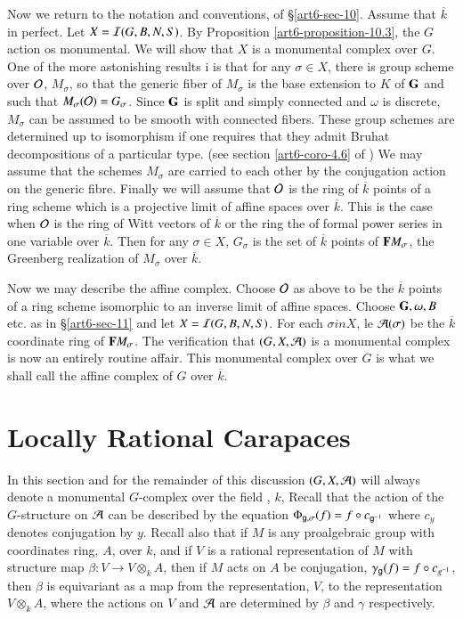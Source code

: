 Now we return to the notation and conventions, of \S \ref{art6-sec-10}. Assume that $\overline{k}$ in perfect. Let $X = \mathcal{I}(G, B, N, S)$. By Proposition \ref{art6-proposition-10.3}, the $G$ action os monumental. We will show that $X$ is a monumental complex over $G$. One of the more astonishing results i \cite{art6-keyBT II} is that for any $\sigma \in X$, there is group scheme over $\mathcal{O}$, $M_{\sigma}$, so that the generic fiber of $M_{\sigma}$ is the base extension to $K$ of $\mathbf{G}$ and such that $M_{\sigma}(\mathcal{O}) = G_{\sigma}$. Since $\mathbf{G}$ is split and simply connected and $\omega$ is discrete, $M_{\sigma}$ can be assumed to be smooth with connected fibers. These group schemes are determined up to isomorphism if one requires that they admit Bruhat decompositions of a particular type. (see section \ref{art6-coro-4.6} of \cite{art6-keyBT II}) We may assume that the schemes $M_{\sigma}$ are carried to each other by the conjugation action on the generic fibre. Finally we will assume that $\mathcal{O}$ is the ring of $\overline{k}$ points of a ring scheme which is a projective limit of affine spaces over $\overline{k}$. This is the case when $\mathcal{O}$ is the ring of Witt vectors of $\overline{k}$ or the ring the of formal power series in one variable over $\overline{k}$. Then for any $\sigma \in X$, $G_{\sigma}$ is the set of $\overline{k}$ points of $\mathbf{F} M_{\sigma}$, the Greenberg realization of $M_{\sigma}$ over $\overline{k}$.  

Now we may describe the affine complex. Choose $\mathcal{O}$ as above to be the $\overline{k}$ points of a ring scheme isomorphic to an inverse limit of affine spaces. Choose $\mathbf{G}, \omega, B$ etc. as in \S \ref{art6-sec-11} and let $X = \mathcal{I}(G, B, N, S)$. For each $\sigma in X$, le $\mathcal{A}(\sigma)$ be the $\overline{k}$ coordinate ring of $\mathbf{F} M_{\sigma}$. The verification that $(G, X, \mathcal{A})$ is a monumental complex is now an  entirely routine affair. This monumental complex over $G$ is what we shall call the affine complex of $G$ over $\overline{k}$.

\section{Locally Rational Carapaces}\label{art6-sec-13}
 In this section and for the remainder of this discussion $(G, X, \mathcal{A})$ will always denote a monumental $G$-complex over the field , $k$, Recall that the action of the $G$-structure on $\mathcal{A}$ can be described by the equation $\Phi_{\mathsf{g}, \sigma}(f) = f \circ c_{\mathsf{g}^{-1}}$ where $c_{y}$ denotes conjugation by $y$. Recall also that if $M$ is any proalgebraic group with coordinates ring, $A$, over $k$, and if $V$ is a rational representation of $M$ with structure map $\beta : V \rightarrow V \otimes_{k} A$, then if $M$ acts on $A$ be conjugation,  $\gamma_{\mathsf{g}}(f) = f \circ c_{g^{-1}}$, then $\beta$ is equivariant as a map from the representation, $V$, to the representation $V\otimes_{k} A$, where the actions on $V$ and $\mathcal{A}$ are determined by $\beta$ and $\gamma$ respectively.

